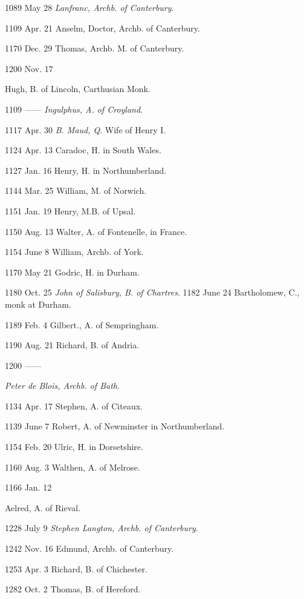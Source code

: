 1089 May
28
\emph{Lanfranc, Archb. of Canterbury}.

1109 Apr.
21
Anselm, Doctor, Archb. of Canterbury.

1170 Dec.
29
Thomas, Archb. M. of Canterbury.

1200 Nov.
17

Hugh, B. of Lincoln, Carthusian Monk.


1109 ——
\emph{Ingulphus,
A. of Croyland}.

1117 Apr.
30
\emph{B. Maud, Q}. Wife of Henry I.

1124 Apr.
13
Caradoc, H. in South Wales.

1127 Jan.
16
Henry, H. in Northumberland.

1144 Mar.
25
William, M. of Norwich.

1151 Jan.
19
Henry, M.B. of Upsal.

1150 Aug.
13
Walter, A. of Fontenelle, in France.

1154 June
8
William, Archb. of York.

1170 May
21
Godric, H. in Durham.

1180 Oct.
25
\emph{John of Salisbury, B. of Chartres}. 1182 June
24
Bartholomew, C., monk at Durham.

1189 Feb.
4
Gilbert., A. of Sempringham.

1190 Aug.
21
Richard, B. of Andria.

1200 ——

\emph{Peter de Blois, Archb. of Bath}.


1134 Apr.
17
Stephen,
A. of Citeaux.

1139 June
7
Robert, A. of Newminster in Northumberland.

1154 Feb.
20
Ulric, H. in Dorsetshire.

1160 Aug.
3
Walthen, A. of Melrose.

1166 Jan.
12

Aelred, A. of Rieval.


1228 July 9
\emph{Stephen
Langton, Archb. of Canterbury}.

1242 Nov. 16
Edmund, Archb. of Canterbury.

1253 Apr. 3
Richard, B. of Chichester.

1282 Oct. 2
Thomas, B. of Hereford.

